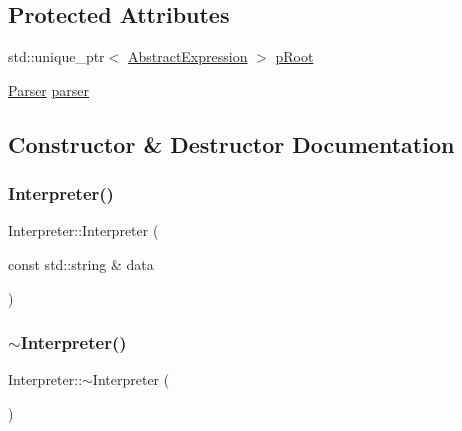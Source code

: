 \subsection*{Protected Attributes}
\begin{DoxyCompactItemize}
\item 
std\+::unique\+\_\+ptr$<$ \mbox{\hyperlink{class_abstract_expression}{Abstract\+Expression}} $>$ \mbox{\hyperlink{class_interpreter_af780f2e13f0ee870ce36c7cfe4a0a286}{p\+Root}}
\item 
\mbox{\hyperlink{class_parser}{Parser}} \mbox{\hyperlink{class_interpreter_a1c142e9f2068dabdbeb1b93e1d2cd3be}{parser}}
\end{DoxyCompactItemize}


\subsection{Constructor \& Destructor Documentation}
\mbox{\label{class_interpreter_a306bccffb1267a2b98da38aca51d15e6}} 
\subsubsection{\texorpdfstring{Interpreter()}{Interpreter()}}
{\footnotesize\ttfamily Interpreter\+::\+Interpreter (\begin{DoxyParamCaption}\item[{const std\+::string \&}]{data }\end{DoxyParamCaption})}

\mbox{\label{class_interpreter_a0f96b57f8126e2b5bc63390121e4b5b1}} 
\subsubsection{\texorpdfstring{$\sim$Interpreter()}{~Interpreter()}}
{\footnotesize\ttfamily Interpreter\+::$\sim$\+Interpreter (\begin{DoxyParamCaption}{ }\end{DoxyParamCaption})\hspace{0.3cm}{\ttfamily [virtual]}}



